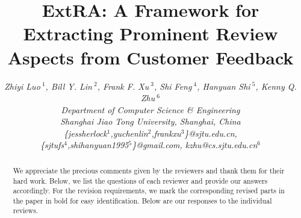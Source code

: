 \documentclass[10pt,conference,letterpaper]{IEEEtran}
\begin{document}
	\title{ExtRA: A Framework for Extracting Prominent Review Aspects from Customer Feedback}
	
\author{
	\fontsize{13}{13}\selectfont\itshape
	Zhiyi Luo{\small $~^{1}$}, Bill Y. Lin{\small $~^{2}$},
	Frank F. Xu{\small $~^{3}$},
	Shi Feng{\small $~^{4}$},
	Hanyuan Shi{\small $~^{5}$},
	Kenny Q. Zhu{\small $~^{6}$}
	\vspace{2mm}\\
	\fontsize{12}{12}\selectfont\itshape
	Department of Computer Science \& Engineering\\
	Shanghai Jiao Tong University, Shanghai, China\\ 
	\fontsize{9}{9}\selectfont\ttfamily\upshape
	\{jessherlock$^{1}$,yuchenlin$^{2}$,frankxu$^{3}$\}@sjtu.edu.cn,\\ 
	\{sjtufs$^{4}$,shihanyuan1995$^{5}$\}@gmail.com, kzhu@cs.sjtu.edu.cn$^{6}$
}

	\maketitle
	\IEEEpeerreviewmaketitle
\begin{abstract}
We appreciate the precious comments given by the reviewers and 
thank them for their hard work. Below, we list the questions of each reviewer 
and provide our answers accordingly.
For the revision requirements, we mark the corresponding revised parts in
the paper in bold for easy identification.
Below are our responses to the individual reviews.
\end{abstract}




\end{document}
